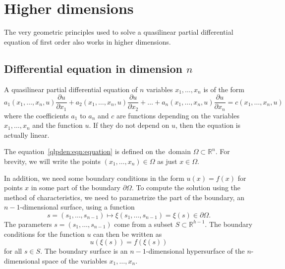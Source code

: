 %
%
%
\section{Higher dimensions
\label{geometry:section:higher-dimensions}}
The very geometric principles used to solve a quasilinear
partial differential equation of first order also works in higher
dimensions.

\subsection{Differential equation in dimension $n$}
A quasilinear partial differential equation of $n$ variables $x_1,\dots,x_n$
is of the form
\begin{equation}
a_1(x_1,\dots,x_n,u) \frac{\partial u}{\partial x_1}
+
a_2(x_1,\dots,x_n,u) \frac{\partial u}{\partial x_2}
+
\dots
+
a_n(x_1,\dots,x_n,u) \frac{\partial u}{\partial x_n}
=
c(x_1,\dots,x_n,u)
\label{qlpden:eqn:equation}
\end{equation}
where the coefficients $a_1$ to $a_n$ and $c$ are functions
depending on the variables $x_1,\dots,x_n$ and the function $u$.
If they do not depend on $u$, then the equation is actually linear.

The equation~\eqref{qlpden:eqn:equation} is defined on the domain
$\Omega\subset\mathbb{R}^n$.
For brevity, we will write the points $(x_1,\dots,x_n)\in \Omega$
as just $x\in\Omega$.

In addition, we need some boundary conditions in the form
$
u(x) = f(x) 
$
for points $x$ in some part of the boundary $\partial\Omega$.
To compute the solution using the method of characteristics, we need to
parametrize the part of the boundary, an $n-1$-dimensional surface, using 
a function
\begin{equation}
s=(s_1,\dots,s_{n-1})
\mapsto
\xi(s_1,\dots,s_{n-1}) = \xi(s) \in \partial\Omega.
\end{equation}
The parameters $s=(s_1,\dots,s_{n-1})$ come from a subset
$S\subset\mathbb{R}^{h-1}$.
The boundary conditions for the function $u$ can then be written as
\begin{equation}
u(\xi(s)) = f(\xi(s))
\end{equation}
for all $s\in S$.
The boundary surface is an $n-1$-dimensional hypersurface of the
$n$-dimensional space of the variables $x_1,\dots,x_n$.

